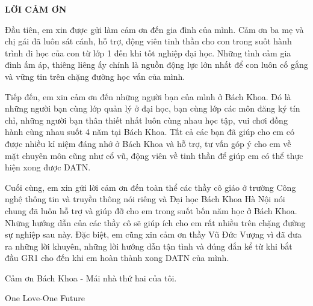 \documentclass[../DoAn.tex]{subfiles}
\begin{document}
\begin{center}
    \Large{\textbf{LỜI CẢM ƠN}}\\
\end{center}
\vspace{1cm}
Đầu tiên, em xin được gửi làm cảm ơn đến gia đình của mình. Cảm ơn ba mẹ và chị gái đã luôn sát cánh, hỗ trợ, động viên tinh thần cho con trong suốt hành trình đi học của con từ lớp 1 đến khi tốt nghiệp đại học. Những tình cảm gia đình ấm áp, thiêng liêng ấy chính là nguồn động lực lớn nhất để con luôn cố gắng và vững tin trên chặng đường học vấn của mình.

Tiếp đến, em xin cảm ơn đến những người bạn của mình ở Bách Khoa. Đó là những người bạn cùng lớp quản lý ở đại học, bạn cùng lớp các môn đăng ký tín chỉ, những người bạn thân thiết nhất luôn cùng nhau học tập, vui chơi đồng hành cùng nhau suốt 4 năm tại Bách Khoa. Tất cả các bạn đã giúp cho em có được nhiều kỉ niệm đáng nhớ ở Bách Khoa và hỗ trợ, tư vấn góp ý cho em về mặt chuyên môn cũng như cổ vũ, động viên về tinh thần để giúp em có thể thực hiện xong được DATN.

Cuối cùng, em xin gửi lời cảm ơn đến toàn thể các thầy cô giáo ở trường Công nghệ thông tin và truyền thông nói riêng và Đại học Bách Khoa Hà Nội nói chung đã luôn hỗ trợ và giúp đỡ cho em trong suốt bốn năm học ở Bách Khoa. Những hướng dẫn của các thầy cô  sẽ giúp ích cho em rất nhiều trên chặng đường sự nghiệp sau này. Đặc biệt, em cũng xin cảm ơn thầy Vũ Đức Vượng vì đã đưa ra những lời khuyên, những lời hướng dẫn tận tình và đúng đắn kể từ khi bắt đầu GR1 cho đến khi em hoàn thành xong DATN của mình.

Cảm ơn Bách Khoa - Mái nhà thứ hai của tôi.

One Love-One Future
\end{document}
